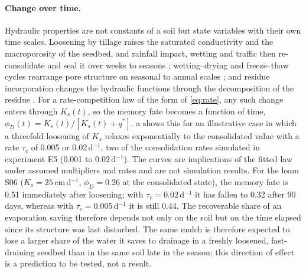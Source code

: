 \documentclass[preprint,12pt,authoryear]{elsarticle}
\begin{document}
\paragraph{Change over time.} Hydraulic properties are not constants of a soil but state variables with their own time scales. Loosening by tillage raises the saturated conductivity and the macroporosity of the seedbed, and rainfall impact, wetting and traffic then re-consolidate and seal it over weeks to seasons \citep{Hillel1998,Brady2016,Strudley2008}; wetting--drying and freeze--thaw cycles rearrange pore structure on seasonal to annual scales \citep{Leuther2021,MirandaVelez2023}; and residue incorporation changes the hydraulic functions through the decomposition of the residue \citep{Leuther2026}. For a rate-competition law of the form of \cref{eq:rate}, any such change enters through $K_s(t)$, so the memory fate becomes a function of time, $\phi_D(t)=K_s(t)/[K_s(t)+q^\ast]$. a shows this for an illustrative case in which a threefold loosening of $K_s$ relaxes exponentially to the consolidated value with a rate $\tau_c$ of 0.005 or 0.02\,d$^{-1}$, two of the consolidation rates simulated in experiment E5 (0.001 to 0.02\,d$^{-1}$). The curves are implications of the fitted law under assumed multipliers and rates and are not simulation results. For the loam S06 ($K_s=25$\,cm\,d$^{-1}$, $\phi_D=0.26$ at the consolidated state), the memory fate is 0.51 immediately after loosening; with $\tau_c=0.02$\,d$^{-1}$ it has fallen to 0.32 after 90 days, whereas with $\tau_c=0.005$\,d$^{-1}$ it is still 0.44. The recoverable share of an evaporation saving therefore depends not only on the soil but on the time elapsed since its structure was last disturbed. The same mulch is therefore expected to lose a larger share of the water it saves to drainage in a freshly loosened, fast-draining seedbed than in the same soil late in the season; this direction of effect is a prediction to be tested, not a result.
\end{document}
